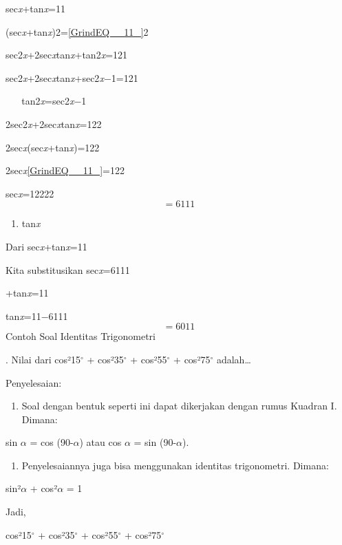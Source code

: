 \documentclass[11pt,fleqn]{book} %
\begin{document}
\noindent sec\textit{x}+tan\textit{x}=11

\noindent (sec\textit{x}+tan\textit{x})2=\eqref{GrindEQ__11_}2

\noindent sec2\textit{x}+2sec\textit{x}tan\textit{x}+tan2\textit{x}=121

\noindent sec2\textit{x}+2sec\textit{x}tan\textit{x}+sec2\textit{x}$\mathrm{-}$1=121

\noindent ~ ~ tan2\textit{x}=sec2\textit{x}$\mathrm{-}$1

\noindent 2sec2\textit{x}+2sec\textit{x}tan\textit{x}=122

\noindent 2sec\textit{x}(sec\textit{x}+tan\textit{x})=122

\noindent 2sec\textit{x}\eqref{GrindEQ__11_}=122

\noindent sec\textit{x}=12222
\[=6111\] 

\begin{enumerate}
\item  tan\textit{x}
\end{enumerate}

\noindent Dari sec\textit{x}+tan\textit{x}=11

\noindent Kita substitusikan sec\textit{x}=6111

+tan\textit{x}=11

\noindent tan\textit{x}=11$\mathrm{-}$6111
\[=6011\] 
Contoh Soal Identitas Trigonometri

. Nilai dari cos²15${}^\circ$ + cos²35${}^\circ$ + cos²55${}^\circ$ + cos²75${}^\circ$ adalah{\dots}

\noindent Penyelesaian:

\begin{enumerate}
\item  Soal dengan bentuk seperti ini dapat dikerjakan dengan rumus Kuadran I. Dimana:
\end{enumerate}

\noindent sin $\alpha$ = cos (90-$\alpha$) atau cos $\alpha$ = sin (90-$\alpha$).

\begin{enumerate}
\item  Penyelesaiannya juga bisa menggunakan identitas trigonometri. Dimana:
\end{enumerate}

\noindent sin²$\alpha$ + cos²$\alpha$ = 1

\noindent Jadi,

\noindent cos²15${}^\circ$ + cos²35${}^\circ$ + cos²55${}^\circ$ + cos²75${}^\circ$
\end{document}
